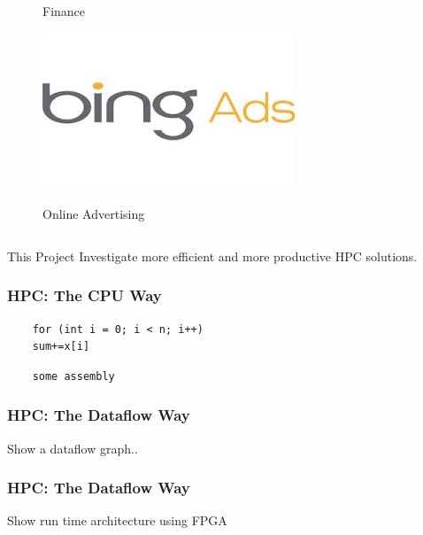 \begin{frame}
\begin{columns}
\begin{center}
\begin{figure}
        \caption{Finance}
      \end{figure}
            \vspace{-0.5cm}
      \begin{figure}
        \includegraphics[scale=0.31]{figs/ads.jpg}\\
        \caption{Online Advertising}
      \end{figure}
    \end{center}
  \end{columns}
  \vspace{0.5cm}
  \begin{beamerboxesrounded}{This Project}
    Investigate more efficient and more productive HPC solutions.
  \end{beamerboxesrounded}
\end{frame}

\begin{frame}[fragile]
  \frametitle{HPC: The CPU Way}
  \begin{lstlisting}
    for (int i = 0; i < n; i++)
    sum+=x[i]
  \end{lstlisting}
  \begin{lstlisting}
    some assembly
  \end{lstlisting}
\end{frame}

\begin{frame}
  \frametitle{HPC: The Dataflow Way}
  Show a dataflow graph..
\end{frame}

\begin{frame}
  \frametitle{HPC: The Dataflow Way}
  Show run time architecture using FPGA
\end{frame}


